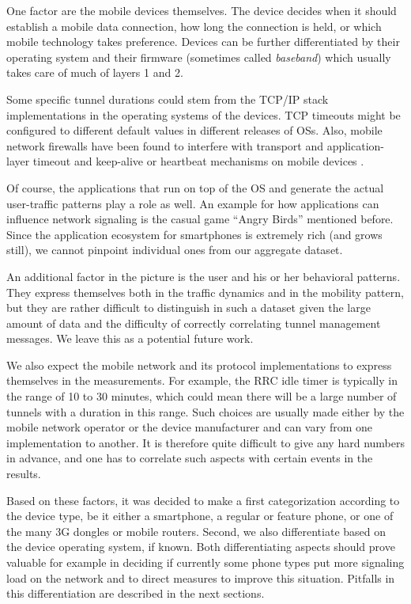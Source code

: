 One factor are the mobile devices themselves. The device decides when it should establish a mobile data connection, how long the connection is held, or which mobile technology takes preference. Devices can be further differentiated by their operating system and their firmware (sometimes called \textit{baseband}) which usually takes care of much of layers 1 and 2.

Some specific tunnel durations could stem from the TCP/IP stack implementations in the operating systems of the devices. TCP timeouts might be configured to different default values in different releases of OSs. Also, mobile network firewalls have been found to interfere with transport and application-layer timeout and keep-alive or heartbeat mechanisms on mobile devices \cite{sigcomm11middleboxes}.

Of course, the applications that run on top of the OS and generate the actual user-traffic patterns play a role as well. An example for how applications can influence network signaling is the casual game ``Angry Birds'' mentioned before. Since the application ecosystem for smartphones is extremely rich (and grows still), we cannot pinpoint individual ones from our aggregate dataset.

An additional factor in the picture is the user and his or her behavioral patterns. They express themselves both in the traffic dynamics and in the mobility pattern, but they are rather difficult to distinguish in such a dataset given the large amount of data and the difficulty of correctly correlating tunnel management messages. We leave this as a potential future work.

We also expect the mobile network and its protocol implementations to express themselves in the measurements. For example, the \gls{RRC} idle timer is typically in the range of 10 to 30 minutes, which could mean there will be a large number of tunnels with a duration in this range. Such choices are usually made either by the mobile network operator or the device manufacturer and can vary from one implementation to another. It is therefore quite difficult to give any hard numbers in advance, and one has to correlate such aspects with certain events in the results.

Based on these factors, it was decided to make a first categorization according to the device type, be it either a smartphone, a regular or feature phone, or one of the many 3G dongles or mobile routers. Second, we also differentiate based on the device operating system, if known. Both differentiating aspects should prove valuable for example in deciding if currently some phone types put more signaling load on the network and to direct measures to improve this situation. Pitfalls in this differentiation are described in the next sections.



